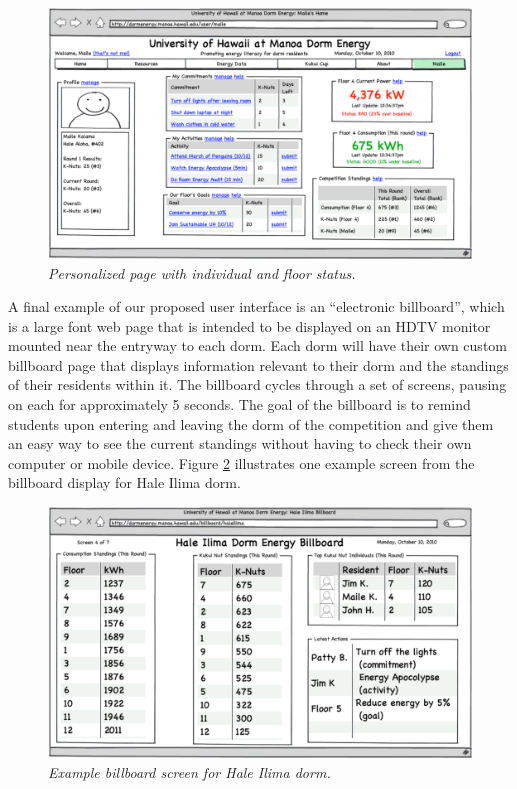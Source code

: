 \documentclass[11pt]{article}
\begin{document}
\begin{figure}[!ht]
  \center
  \includegraphics[width=1.0\textwidth]{maile.png.eps}
  \caption{\em \small Personalized page with individual and floor status.}
 \label{fig:mailepage}
\end{figure} 

A final example of our proposed user interface is an ``electronic billboard'', which is
a large font web page that is intended to be displayed on an HDTV monitor
mounted near the entryway to each dorm. Each dorm will have their own
custom billboard page that displays information relevant to their dorm
and the standings of their residents within it. The billboard cycles
through a set of screens, pausing on each for approximately 5 seconds.  The
goal of the billboard is to remind students upon entering and leaving the
dorm of the competition and give them an easy way to see the current
standings without having to check their own computer or mobile device.  Figure
\ref{fig:billboardpage} illustrates one example screen from the billboard
display for Hale Ilima dorm.

\begin{figure}[!ht]
  \center
  \includegraphics[width=1.0\textwidth]{billboard.png.eps}
  \caption{\em \small Example billboard screen for Hale Ilima dorm.}
 \label{fig:billboardpage}
\end{figure} 
\end{document}
